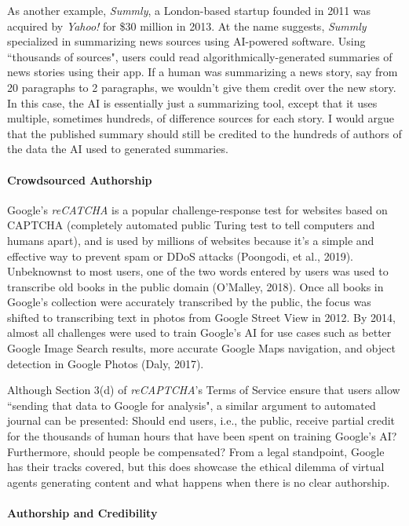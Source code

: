 \documentclass{article}
\begin{document}
As another example, \emph{Summly}, a London-based startup founded in 2011 was acquired by \emph{Yahoo!} for \$30 million in 2013. At the name suggests, \emph{Summly} specialized in summarizing news sources using AI-powered software. Using ``thousands of sources", users could read algorithmically-generated summaries of news stories using their app. If a human was summarizing a news story, say from 20 paragraphs to 2 paragraphs, we wouldn't give them credit over the new story. In this case, the AI is essentially just a summarizing tool, except that it uses multiple, sometimes hundreds, of difference sources for each story. I would argue that the published summary should still be credited to the hundreds of authors of the data the AI used to generated summaries.

\paragraph{Crowdsourced Authorship}

Google's \emph{reCATCHA} is a popular challenge-response test for websites based on CAPTCHA (completely automated public Turing test to tell computers and humans apart), and is used by millions of websites because it's a simple and effective way to prevent spam or DDoS attacks (Poongodi, et al., 2019). Unbeknownst to most users, one of the two words entered by users was used to transcribe old books in the public domain (O'Malley, 2018). Once all books in Google's collection were accurately transcribed by the public, the focus was shifted to transcribing text in photos from Google Street View in 2012. By 2014, almost all challenges were used to train Google's AI for use cases such as better Google Image Search results, more accurate Google Maps navigation, and object detection in Google Photos (Daly, 2017).

Although Section 3(d) of \emph{reCAPTCHA}'s Terms of Service ensure that users allow ``sending that data to Google for analysis", a similar argument to automated journal can be presented: Should end users, i.e., the public, receive partial credit for the thousands of human hours that have been spent on training Google's AI? Furthermore, should people be compensated? From a legal standpoint, Google has their tracks covered, but this does showcase the ethical dilemma of virtual agents generating content and what happens when there is no clear authorship.

\paragraph{Authorship and Credibility}
\end{document}
